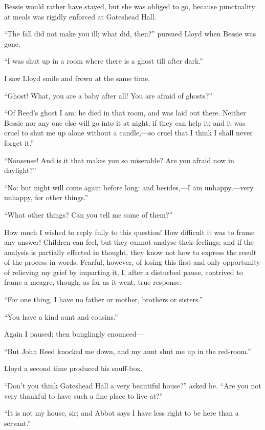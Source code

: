 Bessie would rather have stayed, but she was obliged to go, because
punctuality at meals was rigidly enforced at Gateshead Hall.

\enquote{The fall did not make you ill; what did, then?} pursued \Mr{}
Lloyd when Bessie was gone.

\enquote{I was shut up in a room where there is a ghost till after
dark.}

I saw \Mr{} Lloyd smile and frown at the same time.

\enquote{Ghost!  What, you are a baby after all!  You are afraid of
ghosts?}

\enquote{Of \Mr{} Reed's ghost I am: he died in that room, and was laid
out there.  Neither Bessie nor any one else will go into it at night, if
they can help it; and it was cruel to shut me up alone without a
candle,---so cruel that I think I shall never forget it.}

\enquote{Nonsense!  And is it that makes you so miserable?  Are you
afraid now in daylight?}

\enquote{No: but night will come again before long: and besides,---I am
unhappy,---very unhappy, for other things.}

\enquote{What other things?  Can you tell me some of them?}

How much I wished to reply fully to this question!  How difficult it was
to frame any answer!  Children can feel, but they cannot analyse their
feelings; and if the analysis is partially effected in thought, they
know not how to express the result of the process in words.  Fearful,
however, of losing this first and only opportunity of relieving my grief
by imparting it, I, after a disturbed pause, contrived to frame a
meagre, though, as far as it went, true response.

\enquote{For one thing, I have no father or mother, brothers or
sisters.}

\enquote{You have a kind aunt and cousins.}

Again I paused; then bunglingly enounced---

\enquote{But John Reed knocked me down, and my aunt shut me up in the
red-room.}

\Mr{} Lloyd a second time produced his snuff-box.

\enquote{Don't you think Gateshead Hall a very beautiful house?} asked
he.  \enquote{Are you not very thankful to have such a fine place to
live at?}

\enquote{It is not my house, sir; and Abbot says I have less right to be
here than a servant.}

